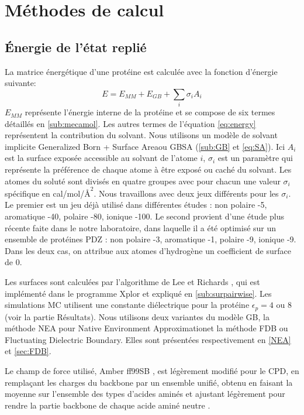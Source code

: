 \section{Méthodes de calcul}
  
\subsection{Énergie de l'état replié}
\label{sec:phia}
La matrice énergétique d'une protéine est calculée avec la fonction d'énergie suivante:
\begin{equation}
  E = E_{MM} + E_{GB} + \sum_i \sigma_iA_i
  \label{eq:energy} 
\end{equation}
$E_{MM}$ représente l'énergie interne de la protéine et se compose de six termes détaillés en \ref{sub:mecamol}. Les autres termes de l'équation \ref{eq:energy} représentent la contribution du solvant. Nous utilisons un modèle de solvant implicite \og Generalized Born + Surface Area\fg ou GBSA (\ref{sub:GB} et \ref{eq:SA}). Ici $A_i$ est la surface exposée accessible au solvant de l'atome $i$, $\sigma_i$ est un paramètre qui représente la préférence de chaque atome à être exposé ou caché du solvant. Les atomes du soluté sont divisés en quatre groupes avec pour chacun une valeur $\sigma_i$ spécifique en cal/mol/$Å^2$. Nous travaillons avec deux jeux différents pour les $\sigma_i$. Le premier est un jeu déjà utilisé dans différentes études \cite{Mignon16,Druart16b}: non polaire -5, aromatique -40, polaire -80, ionique -100. Le second provient d'une étude plus récente faite dans le notre laboratoire, dans laquelle il a été optimisé sur un ensemble de protéines PDZ \cite{Gaillard16}: non polaire -3, aromatique -1, polaire -9, ionique -9. Dans les deux cas, on attribue aux atomes d'hydrogène un coefficient de surface de 0.

Les surfaces sont calculées par l'algorithme de Lee et Richards \cite{Lee71},  qui est implémenté dans le programme Xplor \cite{Xplor} et expliqué en \ref{sub:surpairwise}. Les simulations MC utilisent une constante diélectrique pour la protéine $\epsilon_p = 4$ ou $8$ (voir la partie Résultats).
Nous utilisons deux variantes du modèle  GB, la méthode NEA pour \og Native Environment Approximation\fg et la méthode FDB ou \og Fluctuating Dielectric Boundary\fg \cite{Villa17}. Elles sont présentées respectivement en \ref{NEA} et \ref{sec:FDB}.

Le champ de force utilisé, Amber ff99SB \cite{Cornell95}, est légèrement modifié pour le CPD, en remplaçant les charges du backbone par un ensemble unifié, obtenu en faisant la moyenne sur l'ensemble des types d'acides aminés et ajustant légèrement pour rendre la partie backbone de chaque acide aminé neutre \cite{Aleksandrov10}.

